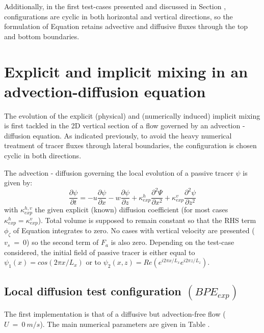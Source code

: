 Additionally, in the first test-cases presented and discussed in Section , configurations are cyclic in both horizontal and vertical directions, so the formulation of Equation  retains advective and diffusive fluxes through the top and bottom boundaries.

\section{Explicit and implicit mixing in an advection-diffusion equation}
\label{section_numlab}
The evolution of the explicit (physical) and (numerically induced) implicit mixing is first tackled in the 2D vertical section of a flow governed by an advection - diffusion equation. As indicated previously, to avoid the heavy numerical treatment of tracer fluxes through lateral boundaries, the configuration is chosen cyclic in both directions.

The advection - diffusion governing the local evolution of a passive tracer $\psi$ is given by:
\begin{equation}
\frac{\partial \psi}{\partial t} = -u\frac{\partial \psi}{\partial x} - w\frac{\partial \psi}{\partial z} + \kappa_{exp}^h \frac{\partial^2 \Psi}{\partial x^2} + \kappa_{exp}^v \frac{\partial^2 \psi}{\partial z^2}
\label{eqAdvDiff}
\end{equation}
with $\kappa_{exp}^{h,v}$ the given explicit (known) diffusion coefficient (for most cases $\kappa_{exp}^{h}=\kappa_{exp}^{v}$).
Total volume is supposed to remain constant so that the RHS term $\phi_{\zeta}$ of Equation  integrates to zero. No cases with vertical velocity are presented ($v_s\ =\ 0$) so the second term of $F_a$ is also zero.
Depending on the test-case considered, the initial field of passive tracer is either equal to $\psi_1(x)=cos(2\pi x/L_x)$ or to $\psi_2(x,z)=Re(e^{i2\pi x/L_x}e^{i 2 \pi z/L_z})$.

\subsection{Local diffusion test configuration $(BPE_{exp})$}

The first implementation is that of a diffusive but advection-free flow ($U\ =\ 0 \ m/s$). The main numerical parameters are given in Table .

